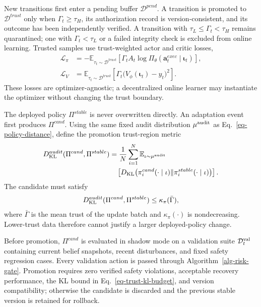 New transitions first enter a pending buffer $\mathcal{D}^{pend}$. A transition is promoted to $\mathcal{D}^{trust}$ only when $\Gamma_t\ge\tau_H$, its authorization record is version-consistent, and its outcome has been independently verified. A transition with $\tau_L\le\Gamma_t<\tau_H$ remains quarantined; one with $\Gamma_t<\tau_L$ or a failed integrity check is excluded from online learning. Trusted samples use trust-weighted actor and critic losses,
\begin{align}
\label{eq-trust-actor-loss}
\mathcal{L}_{\pi}&=-\mathbb{E}_{\tau_t\sim\mathcal{D}^{trust}}
\left[\Gamma_t A_t\log\Pi_\theta(\mathbf{a}^{exec}_t\mid\boldsymbol\iota_t)\right],\\
\label{eq-trust-critic-loss}
\mathcal{L}_{V}&=\mathbb{E}_{\tau_t\sim\mathcal{D}^{trust}}
\left[\Gamma_t\big(V_\phi(\boldsymbol\iota_t)-y_t\big)^2\right].
\end{align}
These losses are optimizer-agnostic; a decentralized online learner may instantiate the optimizer without changing the trust boundary.

The deployed policy $\Pi^{stable}$ is never overwritten directly. An adaptation event first produces $\Pi^{cand}$. Using the same fixed audit distribution $\mu^{\rm audit}$ as Eq.~\ref{eq-policy-distance}, define the promotion trust-region metric
\begin{align}
\label{eq-trust-kl-metric}
D_{\rm KL}^{audit}(\Pi^{cand},\Pi^{stable})
&=\frac{1}{N}\sum_{i=1}^{N}\mathbb{E}_{\iota\sim\mu^{\rm audit}}\nonumber\\
&\quad\left[D_{\rm KL}\!\left(\pi_i^{cand}(\cdot\mid\iota)\|\pi_i^{stable}(\cdot\mid\iota)\right)\right].
\end{align}
The candidate must satisfy
\begin{align}
\label{eq-trust-kl-budget}
D_{\rm KL}^{audit}(\Pi^{cand},\Pi^{stable})
\le\kappa_\pi(\bar\Gamma),
\end{align}
where $\bar\Gamma$ is the mean trust of the update batch and $\kappa_\pi(\cdot)$ is nondecreasing. Lower-trust data therefore cannot justify a larger deployed-policy change.

Before promotion, $\Pi^{cand}$ is evaluated in shadow mode on a validation suite $\mathcal{D}_t^{\rm val}$ containing current belief snapshots, recent disturbances, and fixed safety regression cases. Every validation action is passed through Algorithm~\ref{alg-risk-gate}. Promotion requires zero verified safety violations, acceptable recovery performance, the KL bound in Eq.~\ref{eq-trust-kl-budget}, and version compatibility; otherwise the candidate is discarded and the previous stable version is retained for rollback.

